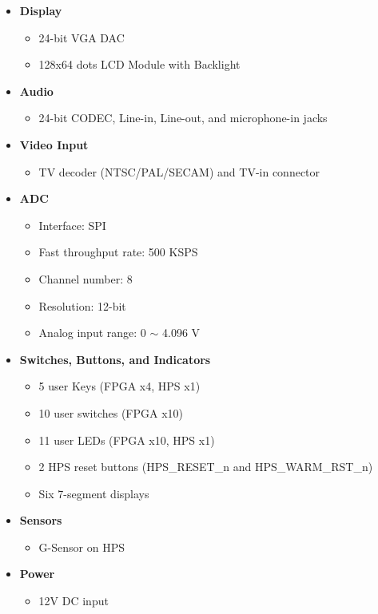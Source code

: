 \begin{itemize}[label=-]
	\item \textbf{Display}
	\begin{itemize}[label=+]
		\item 24-bit VGA DAC
		\item 128x64 dots LCD Module with Backlight
	\end{itemize}
	
	\item \textbf{Audio}
	\begin{itemize}[label=+]
		\item 24-bit CODEC, Line-in, Line-out, and microphone-in jacks
	\end{itemize}
	
	\item \textbf{Video Input}
	\begin{itemize}[label=+]
		\item TV decoder (NTSC/PAL/SECAM) and TV-in connector
	\end{itemize}
	
	\item \textbf{ADC}
	\begin{itemize}[label=+]
		\item Interface: SPI
		\item Fast throughput rate: 500 KSPS
		\item Channel number: 8
		\item Resolution: 12-bit
		\item Analog input range: 0 $\sim$ 4.096 V
	\end{itemize}
	
	\item \textbf{Switches, Buttons, and Indicators}
	\begin{itemize}[label=+]
		\item 5 user Keys (FPGA x4, HPS x1)
		\item 10 user switches (FPGA x10)
		\item 11 user LEDs (FPGA x10, HPS x1)
		\item 2 HPS reset buttons (HPS\_RESET\_n and HPS\_WARM\_RST\_n)
		\item Six 7-segment displays
	\end{itemize}
	
	\item \textbf{Sensors}
	\begin{itemize}[label=+]
		\item G-Sensor on HPS
	\end{itemize}
	
	\item \textbf{Power}
	\begin{itemize}[label=+]
		\item 12V DC input
	\end{itemize}
\end{itemize}


